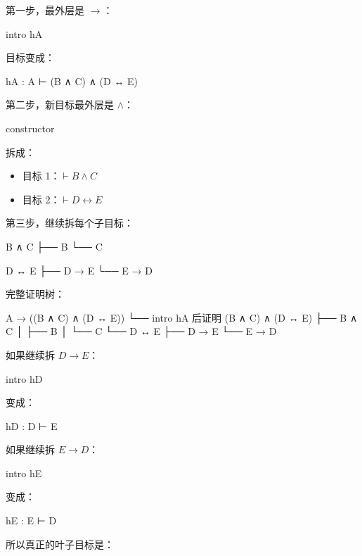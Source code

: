 \documentclass[UTF8,12pt]{ctexart}
\begin{document}
第一步，最外层是 \(\to\)：

\begin{LeanCode}
intro hA
\end{LeanCode}

目标变成：

\begin{LeanCode}
hA : A
⊢ (B ∧ C) ∧ (D ↔ E)
\end{LeanCode}

第二步，新目标最外层是 \(\land\)：

\begin{LeanCode}
constructor
\end{LeanCode}

拆成：
\begin{itemize}
  \item 目标 1：\(\vdash B \land C\)
  \item 目标 2：\(\vdash D \leftrightarrow E\)
\end{itemize}

第三步，继续拆每个子目标：

\begin{Tree}
B ∧ C
├── B
└── C

D ↔ E
├── D → E
└── E → D
\end{Tree}

完整证明树：

\begin{Tree}
A → ((B ∧ C) ∧ (D ↔ E))
└── intro hA 后证明 (B ∧ C) ∧ (D ↔ E)
    ├── B ∧ C
    │   ├── B
    │   └── C
    └── D ↔ E
        ├── D → E
        └── E → D
\end{Tree}

如果继续拆 \(D \to E\)：

\begin{LeanCode}
intro hD
\end{LeanCode}

变成：

\begin{LeanCode}
hD : D
⊢ E
\end{LeanCode}

如果继续拆 \(E \to D\)：

\begin{LeanCode}
intro hE
\end{LeanCode}

变成：

\begin{LeanCode}
hE : E
⊢ D
\end{LeanCode}

所以真正的叶子目标是：
\end{document}
